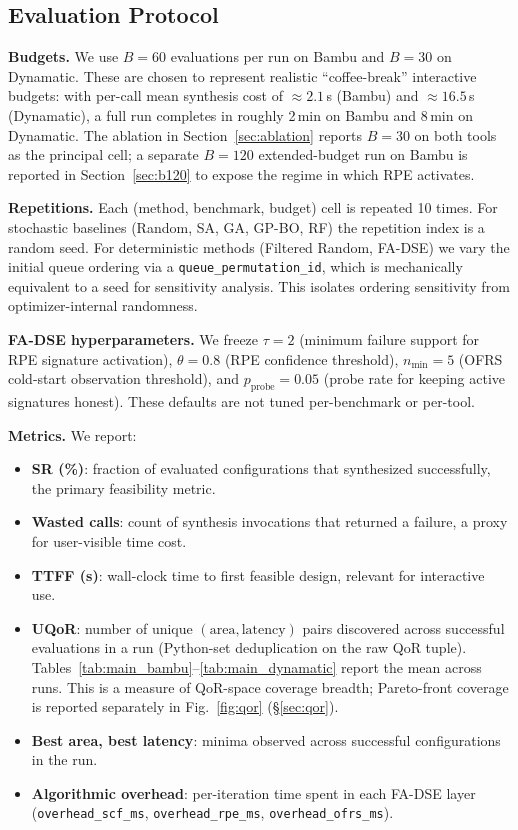 \documentclass[journal]{IEEEtran}
\begin{document}
\subsection{Evaluation Protocol}
\label{sec:protocol}

\textbf{Budgets.} We use $B{=}60$ evaluations per run on Bambu and $B{=}30$ on Dynamatic. These are chosen to represent realistic ``coffee-break'' interactive budgets: with per-call mean synthesis cost of $\approx 2.1$\,s (Bambu) and $\approx 16.5$\,s (Dynamatic), a full run completes in roughly 2\,min on Bambu and 8\,min on Dynamatic. The ablation in Section~\ref{sec:ablation} reports $B{=}30$ on both tools as the principal cell; a separate $B{=}120$ extended-budget run on Bambu is reported in Section~\ref{sec:b120} to expose the regime in which RPE activates.

\textbf{Repetitions.} Each (method, benchmark, budget) cell is repeated 10 times. For stochastic baselines (Random, SA, GA, GP-BO, RF) the repetition index is a random seed. For deterministic methods (Filtered Random, FA-DSE) we vary the initial queue ordering via a \texttt{queue\_permutation\_id}, which is mechanically equivalent to a seed for sensitivity analysis. This isolates ordering sensitivity from optimizer-internal randomness.

\textbf{FA-DSE hyperparameters.} We freeze $\tau{=}2$ (minimum failure support for RPE signature activation), $\theta{=}0.8$ (RPE confidence threshold), $n_{\min}{=}5$ (OFRS cold-start observation threshold), and $p_{\text{probe}}{=}0.05$ (probe rate for keeping active signatures honest). These defaults are not tuned per-benchmark or per-tool.

\textbf{Metrics.} We report:
\begin{itemize}
    \item \textbf{SR (\%)}: fraction of evaluated configurations that synthesized successfully, the primary feasibility metric.
    \item \textbf{Wasted calls}: count of synthesis invocations that returned a failure, a proxy for user-visible time cost.
    \item \textbf{TTFF (s)}: wall-clock time to first feasible design, relevant for interactive use.
    \item \textbf{UQoR}: number of unique $(\text{area}, \text{latency})$ pairs discovered across successful evaluations in a run (Python-set deduplication on the raw QoR tuple). Tables~\ref{tab:main_bambu}--\ref{tab:main_dynamatic} report the mean across runs. This is a measure of QoR-space coverage breadth; Pareto-front coverage is reported separately in Fig.~\ref{fig:qor} (\S\ref{sec:qor}).
    \item \textbf{Best area, best latency}: minima observed across successful configurations in the run.
    \item \textbf{Algorithmic overhead}: per-iteration time spent in each FA-DSE layer (\texttt{overhead\_scf\_ms}, \texttt{overhead\_rpe\_ms}, \texttt{overhead\_ofrs\_ms}).
\end{itemize}
\end{document}

